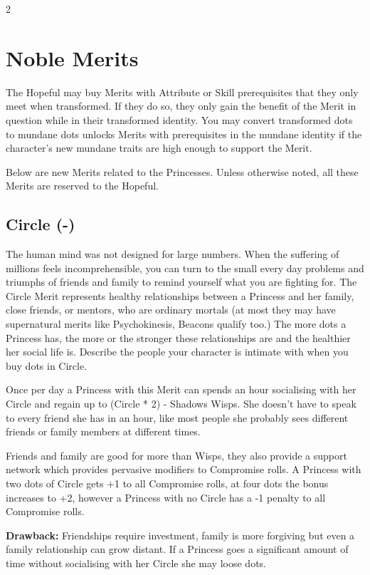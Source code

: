 \begin{multicols}{2}
\section*{Noble Merits} 
The Hopeful may buy Merits with Attribute or Skill prerequisites that they only meet when transformed. If they do so, they only gain the benefit of the Merit in question while in their transformed identity. You may convert transformed dots to mundane dots unlocks Merits with prerequisites in the mundane identity if the character's new mundane traits are high enough to support the Merit.

Below are new Merits related to the Princesses. Unless otherwise noted, all these Merits are reserved to the Hopeful. 

\subsection*{Circle (\textbullet\nobreak\hspace{.16667em}-\nobreak\hspace{.16667em}\textbullet\textbullet\textbullet\textbullet\textbullet)}

The human mind was not designed for large numbers. When the suffering of millions feels incomprehensible, you can turn to the small every day problems and triumphs of friends and family to remind yourself what you are fighting for. The Circle Merit represents healthy relationships between a Princess and her family, close friends, or mentors, who are ordinary mortals (at most they may have supernatural merits like Psychokinesis, Beacons qualify too.) The more dots a Princess has, the more or the stronger these relationships are and the healthier her social life is. Describe the people your character is intimate with when you buy dots in Circle.

Once per day a Princess with this Merit can spends an hour socialising with her Circle and regain up to (Circle * 2) - Shadows Wisps. She doesn’t have to speak to every friend she has in an hour, like most people she probably sees different friends or family members at different times. 

Friends and family are good for more than Wisps, they also provide a support network which provides pervasive modifiers to Compromise rolls. A Princess with two dots of Circle gets +1 to all Compromise rolls, at four dots the bonus increases to +2, however a Princess with no Circle has a -1 penalty to all Compromise rolls.

\textbf{Drawback:} Friendships require investment, family is more forgiving but even a family relationship can grow distant. If a Princess goes a significant amount of time without socialising with her Circle she may loose dots. 


\end{multicols}
